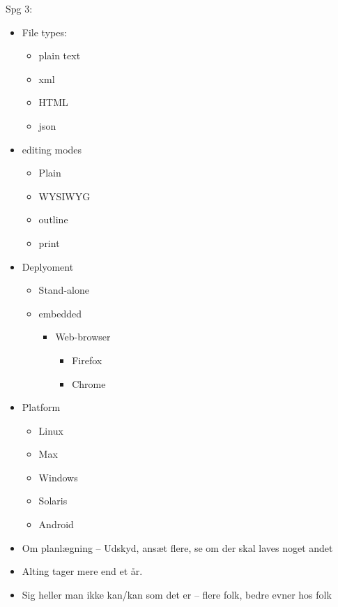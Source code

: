 \documentclass[a4, 10pt]{article}
\begin{document}
Spg 3:
\begin{itemize}
	\item File types:
		\begin{itemize}
			\item plain text
			\item xml
			\item HTML
			\item json
		\end{itemize}
	\item editing modes
	\begin{itemize}
		\item Plain
		\item WYSIWYG
		\item outline
		\item print
	\end{itemize}
	\item Deplyoment
	\begin{itemize}
		\item Stand-alone
		\item embedded
		\begin{itemize}
			\item Web-browser
			\begin{itemize}
				\item Firefox
				\item Chrome
			\end{itemize}
		\end{itemize}
	\end{itemize}

	\item Platform
	\begin{itemize}
		\item Linux
		\item Max 
		\item Windows
		\item Solaris
		\item Android
	\end{itemize}
\end{itemize}


\begin{itemize}
	\item Om planlægning -- Udskyd, ansæt flere, se om der skal laves noget andet
	\item Alting tager mere end et år.
	\item Sig heller man ikke kan/kan som det er -- flere folk, bedre evner hos folk
\end{itemize}
\end{document}
